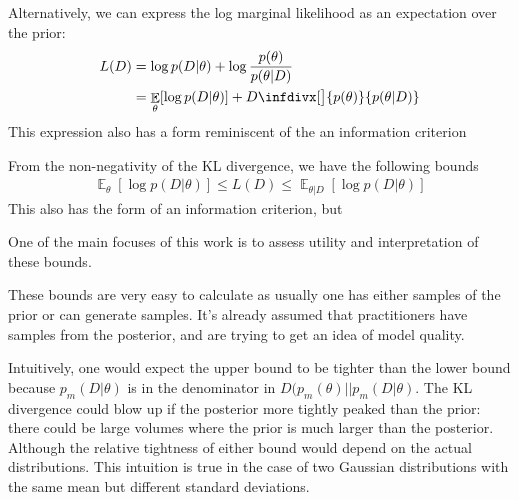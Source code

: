 \documentclass[10pt,a4paper]{article}
\DeclareMathOperator{\EX}{\mathbb{E}}%
\newcommand{\infdiv}{D\infdivx}
\begin{document}
Alternatively, we can express the log marginal likelihood as an expectation over the prior:
\begin{align}
L(D) &= \log p(D | \theta) + \log \frac{p(\theta)}{p(\theta | D)}  \notag\\
&= \EX_{\theta} [ \log  p(D|\theta)] + \infdiv[\big]{p(\theta)}{ p(\theta|D)}
\end{align}
This expression also has a form reminiscent of the an information criterion


From the non-negativity of the KL divergence, we have the following bounds
\begin{align}
\EX_{\theta} [\log  p(D|\theta)  ] \leq L(D) \leq \EX_{\theta | D} [ \log  p(D|\theta) ]
\label{eq:upp_low}
\end{align}
This also has the form of an information criterion, but 

One of the main focuses of this work is to assess utility and interpretation of these bounds.

These bounds are very easy to calculate as usually one has either samples of the prior or can generate samples. It's already assumed that practitioners have samples from the posterior, and are trying to get an idea of model quality.

Intuitively, one would expect the upper bound to be tighter than the lower bound because $p_m(D|\theta)$ is in the denominator in $D(p_m(\theta) || p_m(D|\theta)$. The KL divergence could blow up if the posterior more tightly peaked than the prior: there could be large volumes where the prior is much larger than the posterior. Although the relative tightness of either bound would depend on the actual distributions. This intuition is true in the case of two Gaussian distributions with the same mean but different standard deviations.
\end{document}
